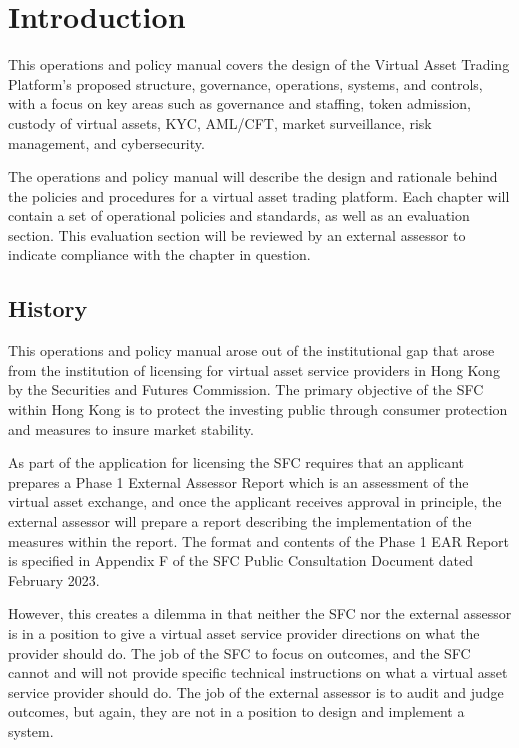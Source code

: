 \chapter{Introduction}

This operations and policy manual covers the design of
the Virtual Asset Trading Platform's proposed structure, governance,
operations, systems, and controls, with a focus on key areas such as
governance and staffing, token admission, custody of virtual assets,
KYC, AML/CFT, market surveillance, risk management, and cybersecurity.

The operations and policy manual will describe the design and
rationale behind the policies and procedures for a virtual asset
trading platform.  Each chapter will contain a set of operational
policies and standards, as well as an evaluation section.  This
evaluation section will be reviewed by an external assessor to
indicate compliance with the chapter in question.

\section{History}

This operations and policy manual arose out of the institutional gap
that arose from the institution of licensing for virtual asset service
providers in Hong Kong by the Securities and Futures Commission.  The
primary objective of the SFC within Hong Kong is to protect the
investing public through consumer protection and measures to insure
market stability.

As part of the application for licensing the SFC requires that an
applicant prepares a Phase 1 External Assessor Report which is an
assessment of the virtual asset exchange, and once the applicant
receives approval in principle, the external assessor will prepare
a report describing the implementation of the measures within the
report.  The format and contents of the Phase 1 EAR Report is
specified in Appendix F of the SFC Public Consultation Document dated
February 2023.

However, this creates a dilemma in that neither the SFC nor the
external assessor is in a position to give a virtual asset service
provider directions on what the provider should do.  The job of the
SFC to focus on outcomes, and the SFC cannot and will not provide
specific technical instructions on what a virtual asset service
provider should do.  The job of the external assessor is to audit and judge outcomes, but again, they are not in a position to
design and implement a system.

